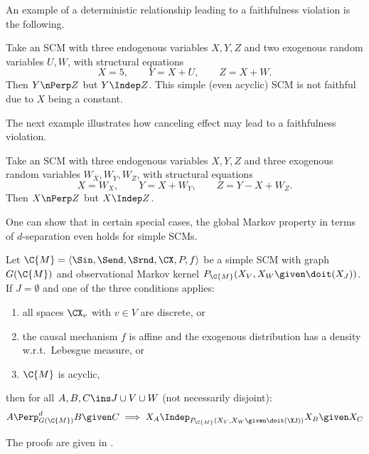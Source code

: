 An example of a deterministic relationship leading to a faithfulness violation is the following.
\begin{Eg}
  Take an SCM with three endogenous variables $X,Y,Z$ and two exogenous random variables $U,W$, with structural equations
  $$X = 5, \qquad Y = X + U, \qquad Z = X + W.$$
  Then $Y \nPerp Z$ but $Y \Indep Z$.
  This simple (even acyclic) SCM is not faithful due to $X$ being a constant.
\end{Eg}
The next example illustrates how canceling effect may lead to a faithfulness violation.
\begin{Eg}
  Take an SCM with three endogenous variables $X,Y,Z$ and three exogenous random variables $W_X,W_Y,W_Z$, with structural equations
  $$X = W_X, \qquad Y = X + W_Y, \qquad Z = Y - X + W_Z.$$
  Then $X \nPerp Z$ but $X \Indep Z$.
\end{Eg}
One can show that in certain special cases, the global Markov property in terms of $d$-separation even holds for simple SCMs.
\begin{Prp}
  Let $\C{M} = \langle \Sin, \Send, \Srnd, \CX, P, f \rangle$ be a simple SCM with graph $G(\C{M})$
  and observational Markov kernel $P_{\C{M}}(X_V,X_W \given \doit(X_J))$.
  If $J = \emptyset$ and one of the three conditions applies:
  \begin{enumerate}
    \item all spaces $\CX_v$ with $v \in V$ are discrete, or
    \item the causal mechanism $f$ is affine and the exogenous distribution has a density w.r.t.\ Lebesgue measure, or
    \item $\C{M}$ is acyclic,
  \end{enumerate} 
  then for all $A, B, C \ins J \cup V \cup W$ (not necessarily disjoint):
  $$A \Perp^d_{G(\C{M})} B \given C \implies X_A \Indep_{P_{\C{M}}(X_V,X_W \given \doit(\XJ))} X_B \given X_C$$
\end{Prp}
The proofs are given in \cite{FM17}.

